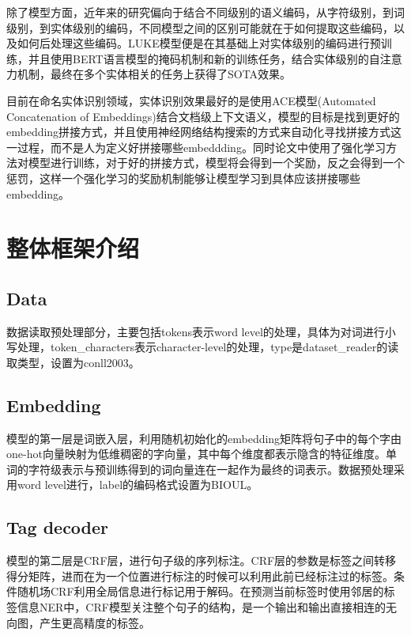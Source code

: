 \documentclass[a4paper, 12pt]{article}
\begin{document}
除了模型方面，近年来的研究偏向于结合不同级别的语义编码，从字符级别，到词级别，到实体级别的编码，不同模型之间的区别可能就在于如何提取这些编码，以及如何后处理这些编码。LUKE模型便是在其基础上对实体级别的编码进行预训练，并且使用BERT语言模型的掩码机制和新的训练任务，结合实体级别的自注意力机制，最终在多个实体相关的任务上获得了SOTA效果。

目前在命名实体识别领域，实体识别效果最好的是使用ACE模型(Automated Concatenation of Embeddings)结合文档级上下文语义，模型的目标是找到更好的embedding拼接方式，并且使用神经网络结构搜索的方式来自动化寻找拼接方式这一过程，而不是人为定义好拼接哪些embeddding。同时论文中使用了强化学习方法对模型进行训练，对于好的拼接方式，模型将会得到一个奖励，反之会得到一个惩罚，这样一个强化学习的奖励机制能够让模型学习到具体应该拼接哪些embedding。

\section{整体框架介绍} %
\label{sec:frame}

\subsection{Data} %
\label{sub:data}
数据读取预处理部分，主要包括tokens表示word level的处理，具体为对词进行小写处理，token\_characters表示character-level的处理，type是dataset\_reader的读取类型，设置为conll2003。

\subsection{Embedding} %
\label{sub:embed}

模型的第一层是词嵌入层，利用随机初始化的embedding矩阵将句子中的每个字由one-hot向量映射为低维稠密的字向量，其中每个维度都表示隐含的特征维度。单词的字符级表示与预训练得到的词向量连在一起作为最终的词表示。数据预处理采用word level进行，label的编码格式设置为BIOUL。

\subsection{Tag decoder} %
\label{sub:decoder}
模型的第二层是CRF层，进行句子级的序列标注。CRF层的参数是标签之间转移得分矩阵，进而在为一个位置进行标注的时候可以利用此前已经标注过的标签。条件随机场CRF利用全局信息进行标记用于解码。在预测当前标签时使用邻居的标签信息NER中，CRF模型关注整个句子的结构，是一个输出和输出直接相连的无向图，产生更高精度的标签。
\end{document}
